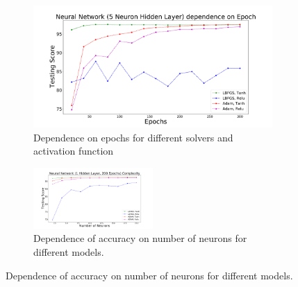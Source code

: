 \begin{figure}[h]

\begin{figure}[h]
\includegraphics[width=\onepic\textwidth]{plots/nn_assoc_four.pdf}
\caption{
Dependence on epochs for different solvers and activation function
}
\label{fig:NN_epochs}
\end{figure}



\begin{figure}[h]
\includegraphics[width=0.5\textwidth]{plots/neurons3.pdf}
\caption{Dependence of accuracy on number of neurons for different models.
}
\label{fig:NN_neurons}
\end{figure}


\end{figure}
